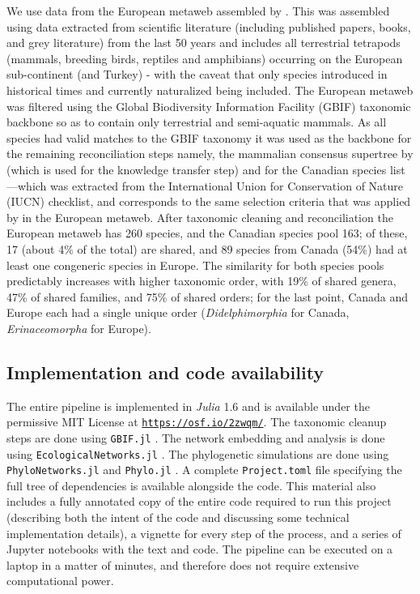 We use data from the European metaweb assembled by \cite{Maiorano2020TetSpe}.
This was assembled using data extracted from scientific literature
(including published papers, books, and grey literature) from the last
50 years and includes all terrestrial tetrapods (mammals, breeding
birds, reptiles and amphibians) occurring on the European sub-continent
(and Turkey) - with the caveat that only species introduced in
historical times and currently naturalized being included. The European
metaweb was filtered using the Global Biodiversity Information Facility
(GBIF) taxonomic backbone \cite{GBIFSecretariat2021GbiBac} so as to
contain only terrestrial and semi-aquatic mammals. As all species had
valid matches to the GBIF taxonomy it was used as the backbone for the
remaining reconciliation steps namely, the mammalian consensus supertree
by \cite{Upham2019InfMam} (which is used for the knowledge transfer step) and
for the Canadian species list---which was extracted from the
International Union for Conservation of Nature (IUCN) checklist, and
corresponds to the same selection criteria that was applied by
\cite{Maiorano2020TetSpe} in the European metaweb. After taxonomic cleaning
and reconciliation the European metaweb has 260 species, and the
Canadian species pool 163; of these, 17 (about 4\% of the total) are
shared, and 89 species from Canada (54\%) had at least one congeneric
species in Europe. The similarity for both species pools predictably
increases with higher taxonomic order, with 19\% of shared genera, 47\%
of shared families, and 75\% of shared orders; for the last point,
Canada and Europe each had a single unique order (\emph{Didelphimorphia}
for Canada, \emph{Erinaceomorpha} for Europe).

\subsection{Implementation and code
availability}\label{implementation-and-code-availability}

The entire pipeline is implemented in \emph{Julia} 1.6
\cite{Bezanson2017JulFre} and is available under the permissive MIT
License at \href{https://osf.io/2zwqm/}{\texttt{https://osf.io/2zwqm/}}.
The taxonomic cleanup steps are done using \texttt{GBIF.jl}
\cite{Dansereau2021SimJl}. The network embedding and analysis is done
using \texttt{EcologicalNetworks.jl} \cite{Banville2021ManJl,
Poisot2019EcoJl}. The phylogenetic simulations are done using
\texttt{PhyloNetworks.jl} \cite{Solis-Lemus2017PhyPac} and
\texttt{Phylo.jl} \cite{Reeve2016HowPar}. A complete
\texttt{Project.toml} file specifying the full tree of dependencies is
available alongside the code. This material also includes a fully
annotated copy of the entire code required to run this project
(describing both the intent of the code and discussing some technical
implementation details), a vignette for every step of the process, and a
series of Jupyter notebooks with the text and code. The pipeline can be
executed on a laptop in a matter of minutes, and therefore does not
require extensive computational power.

